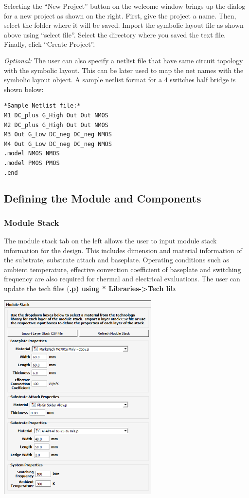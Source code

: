 \documentclass[11pt]{article}
\begin{document}
Selecting the “New Project” button on the welcome window brings up the dialog for a new project as shown on the right. First, give the project a name. Then, select the folder where it will be saved. Import the symbolic layout file as shown above using “select file”. Select the directory where you saved the text file. Finally, click “Create Project”. 

\emph{Optional:}
The user can also specify a netlist file that have same circuit topology with the symbolic layout. 
This can be later used to map the net names with the symbolic layout object. A sample netlist format for a 4 switches half bridge is shown below:

\begin{verbatim}
*Sample Netlist file:*
M1 DC_plus G_High Out Out NMOS
M2 DC_plus G_High Out Out NMOS
M3 Out G_Low DC_neg DC_neg NMOS
M4 Out G_Low DC_neg DC_neg NMOS
.model NMOS NMOS
.model PMOS PMOS
.end
\end{verbatim}

\subsection{Defining the Module and Components}
\label{sec-2-3}
\subsubsection{Module Stack}
\label{sec-2-3-1}

The module stack tab on the left allows the user to input module stack information for the design. This includes dimension and material information of the substrate, substrate attach and baseplate. Operating conditions such as ambient temperature, effective convection coefficient of baseplate and switching frequency are also required for thermal and electrical evaluations.  The user can update the tech files (\textbf{.p) using * Libraries->Tech lib}.

\begin{center}
\includegraphics[width=8cm]{./figs/05_LayerStack.png}
\end{center}
\end{document}

